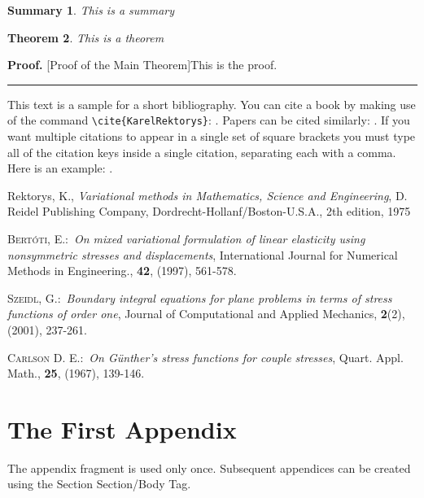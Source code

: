 \documentclass{article}%
\newtheorem{theorem}{Theorem}
\newtheorem{summary}[theorem]{Summary}
\newenvironment{proof}[1][Proof]{\textbf{#1.} }{\ \rule{0.5em}{0.5em}}
\begin{document}
\begin{summary}
This is a summary
\end{summary}

\begin{theorem}
This is a theorem
\end{theorem}

\begin{proof}
[Proof of the Main Theorem]This is the proof.
\end{proof}
\medskip

This text is a sample for a short bibliography. You can cite a book by making use of
the command \verb"\cite{KarelRektorys}": \cite{KarelRektorys}. Papers can be cited
similarly: \cite{Bertoti97}. If you want multiple citations to appear in a single set
of square brackets you must type all of the citation keys inside a single citation,
separating each with a comma. Here is an example: \cite{Bertoti97, Szeidl2001,
Carlson67}.

\begin{thebibliography}{9}                                                                                                %
Rektorys, K., \textit{Variational methods in Mathematics,
Science and Engineering}, D. Reidel Publishing Company,
Dordrecht-Hollanf/Boston-U.S.A., 2th edition, 1975

 \textsc{Bert\'{o}ti, E.}:\ \textit{On mixed variational formulation
of linear elasticity using nonsymmetric stresses and displacements}, International
Journal for Numerical Methods in Engineering., \textbf{42}, (1997), 561-578.

 \textsc{Szeidl, G.}:\ \textit{Boundary integral equations for
plane problems in terms of stress functions of order one}, Journal of Computational and
Applied Mechanics, \textbf{2}(2), (2001), 237-261.

  \textsc{Carlson D. E.}:\ \textit{On G\"{u}nther's stress functions
for couple stresses}, Quart. Appl. Math., \textbf{25}, (1967), 139-146.
\end{thebibliography}


\appendix

\section{The First Appendix}

The appendix fragment is used only once. Subsequent appendices can be created
using the Section Section/Body Tag.
\end{document}
